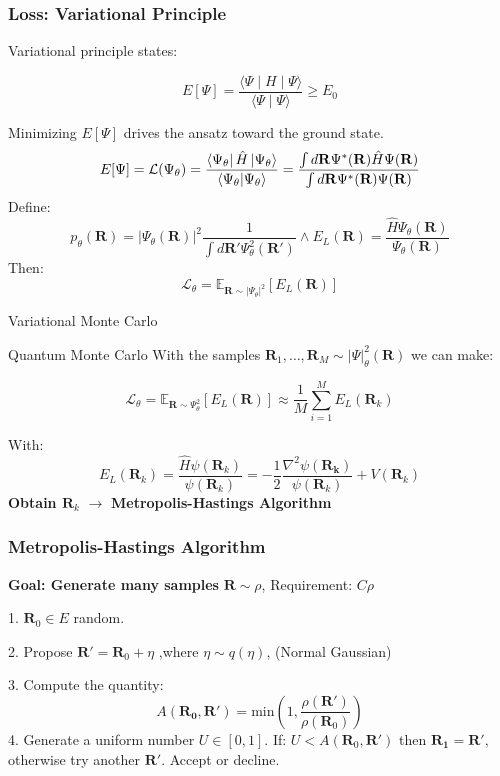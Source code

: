 \documentclass{beamer}
\begin{document}
\begin{frame}
\frametitle{Loss: Variational Principle}

Variational principle states:

$$E[\Psi] = \displaystyle \frac{\langle \Psi \mid H \mid \Psi \rangle}{\langle \Psi \mid \Psi \rangle} \ge E_0$$

Minimizing $E[\Psi]$ drives the ansatz toward the ground state.
$$
E[\Psi]=\mathcal{L}(\Psi_\theta)=\frac{\bra{\Psi_{\theta}} \hat{H}\ket{\Psi_{\theta}} }{\braket{ \Psi_{\theta}} }=\frac{\int d\mathbf{R}\Psi ^{*}(\mathbf{R})\hat{H}\Psi(\mathbf{R})}{\int d\mathbf{R}\Psi ^{*}(\mathbf{R})\Psi(\mathbf{R})}
$$
Define:
$$p_{\theta}(\mathbf{R})=|\Psi_{\theta}(\mathbf{R})|^{2}\frac{1}{\int  d\mathbf{R}'\Psi^{2}_{\theta}(\mathbf{R}')}\land E_{L}(\mathbf{R})=\frac{\hat{H}\Psi_{\theta}(\mathbf{R})}{\Psi_{\theta}(\mathbf{R})}
$$
Then:
\begin{equation}
\mathcal{L}_{\theta}=\mathbb{E}_{\mathbf{R}\sim |\Psi_{\theta}| ^{2}}[E_{L}(\mathbf{R})]
\end{equation}
\end{frame}
\begin{frame}{Variational Monte Carlo}
  \begin{block}{Quantum Monte Carlo}
With the samples $\mathbf{R}_{1},\dots,\mathbf{R}_{M}\sim |\Psi| ^{2}_{\theta}(\mathbf{R})$ we can make:

\begin{equation}
\mathcal{L}_{\theta}=\mathbb{E}_{\mathbf{R}\sim \Psi ^{2}_{\theta}}[E_{L}(\mathbf{R})]\approx \frac{1}{M}\sum_{i=1}^{M} E_{L}(\mathbf{R}_{k})
\end{equation}
\end{block}
With:
$$E_{L}(\mathbf{R}_{k})=\frac{\hat{H}\psi(\mathbf{R}_{k})}{\psi(\mathbf{R}_{k})}=-\frac{1}{2}\frac{\nabla^{2}\psi(\mathbf{R_{k}})}{\psi(\mathbf{R}_{k})}+V(\mathbf{R}_{k})
$$
\textbf{Obtain $\mathbf{R}_k$} $\to$ \textbf{Metropolis-Hastings Algorithm}
\end{frame}
\begin{frame}
  \frametitle{Metropolis-Hastings Algorithm}
\textbf{Goal: Generate many samples} $\mathbf{R}\sim \rho$, Requirement: $C\rho$

1. $\mathbf{R}_{0}\in E$ random.

2. Propose $\mathbf{R}'=\mathbf{R}_{0}+\eta$ ,where $\eta \sim q(\eta)$, (Normal Gaussian)

3. Compute the quantity:
$$
A(\mathbf{R_{0}}, \mathbf{R}')=\text{min}\left( 1,\frac{\rho(\mathbf{R}')}{\rho(\mathbf{R}_{0})} \right)
$$
4. Generate a uniform number $U\in[0,1]$. If: $U<A(\mathbf{R}_{0} ,\mathbf{R'})$ then $\mathbf{R_{1}}=\mathbf{R}'$, otherwise try another $\mathbf{R}'$. Accept or decline.

\end{frame}
\end{document}
